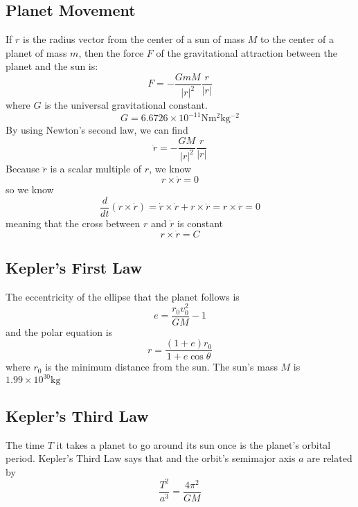 \documentclass[../main.tex]{subfiles}
\begin{document}
\subsection{Planet Movement}
If $r$ is the radius vector from the center of a sun of mass $M$ to the center of a planet of mass $m$,
then the force $F$ of the gravitational attraction between the planet and the sun is:
\begin{equation*}
F = - \frac{GmM}{|r|^2} \frac{r}{|r|}
\end{equation*}
where $G$ is the universal gravitational constant. 
\begin{equation*}
G = 6.6726 \times 10^{-11} \si{\newton \meter^2 \kilogram^{-2}}
\end{equation*}
By using Newton's second law, we can find
\begin{equation*}
\ddot r = - \frac{GM}{|r|^2} \frac{r}{|r|}
\end{equation*}
Because $\ddot r$ is a scalar multiple of $r$, we know 
\begin{equation*}
r \times \ddot r = 0
\end{equation*}
so we know
\begin{equation*}
\frac{d}{dt} (r \times \dot r) = \dot r \times \dot r + r \times \ddot r = r \times \ddot r = 0
\end{equation*}
meaning that the cross between $r$ and $\dot r$ is constant
\begin{equation*}
r \times \dot r = C
\end{equation*}

\subsection{Kepler's First Law}
The eccentricity of the ellipse that the planet follows is 
\begin{equation*}
e = \frac{r_0 v_0^2}{GM} - 1
\end{equation*}
and the polar equation is 
\begin{equation*}
r = \frac{(1+e)r_0}{1+e \cos \theta}
\end{equation*}
where $r_0$ is the minimum distance from the sun. The sun's mass $M$ is 
$1.99 \times 10^{30} \si{ \kilogram}$

\subsection{Kepler's Third Law}
The time $T$ it takes a planet to go around its sun once is the planet's orbital period. Kepler's
Third Law says that and the orbit's semimajor axis $a$ are related by
\begin{equation*}
\frac{T^2}{a^3} = \frac{4\pi^2}{GM}
\end{equation*}
\end{document}
